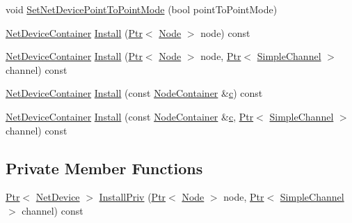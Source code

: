 \begin{DoxyCompactItemize}
\item 
void \hyperlink{classns3_1_1SimpleNetDeviceHelper_a474460ba6942d4933f443a97df7d4716}{Set\+Net\+Device\+Point\+To\+Point\+Mode} (bool point\+To\+Point\+Mode)
\item 
\hyperlink{classns3_1_1NetDeviceContainer}{Net\+Device\+Container} \hyperlink{classns3_1_1SimpleNetDeviceHelper_a35bed9cee32d306362d3e24dfeef4513}{Install} (\hyperlink{classns3_1_1Ptr}{Ptr}$<$ \hyperlink{classns3_1_1Node}{Node} $>$ node) const 
\item 
\hyperlink{classns3_1_1NetDeviceContainer}{Net\+Device\+Container} \hyperlink{classns3_1_1SimpleNetDeviceHelper_abb3ec761e98e5077861df24ba3094723}{Install} (\hyperlink{classns3_1_1Ptr}{Ptr}$<$ \hyperlink{classns3_1_1Node}{Node} $>$ node, \hyperlink{classns3_1_1Ptr}{Ptr}$<$ \hyperlink{classns3_1_1SimpleChannel}{Simple\+Channel} $>$ channel) const 
\item 
\hyperlink{classns3_1_1NetDeviceContainer}{Net\+Device\+Container} \hyperlink{classns3_1_1SimpleNetDeviceHelper_a60845d498c7211f62e41fbb40e3dbdfd}{Install} (const \hyperlink{classns3_1_1NodeContainer}{Node\+Container} \&\hyperlink{mmwave_2model_2fading-traces_2fading__trace__generator_8m_ae0323a9039add2978bf5b49550572c7c}{c}) const 
\item 
\hyperlink{classns3_1_1NetDeviceContainer}{Net\+Device\+Container} \hyperlink{classns3_1_1SimpleNetDeviceHelper_a1bdeb979bedc52e48c977a7f616457a9}{Install} (const \hyperlink{classns3_1_1NodeContainer}{Node\+Container} \&\hyperlink{mmwave_2model_2fading-traces_2fading__trace__generator_8m_ae0323a9039add2978bf5b49550572c7c}{c}, \hyperlink{classns3_1_1Ptr}{Ptr}$<$ \hyperlink{classns3_1_1SimpleChannel}{Simple\+Channel} $>$ channel) const 
\end{DoxyCompactItemize}
\subsection*{Private Member Functions}
\begin{DoxyCompactItemize}
\item 
\hyperlink{classns3_1_1Ptr}{Ptr}$<$ \hyperlink{classns3_1_1NetDevice}{Net\+Device} $>$ \hyperlink{classns3_1_1SimpleNetDeviceHelper_a9e4668526669e31a0da0c94f5ebb55ba}{Install\+Priv} (\hyperlink{classns3_1_1Ptr}{Ptr}$<$ \hyperlink{classns3_1_1Node}{Node} $>$ node, \hyperlink{classns3_1_1Ptr}{Ptr}$<$ \hyperlink{classns3_1_1SimpleChannel}{Simple\+Channel} $>$ channel) const 
\end{DoxyCompactItemize}
